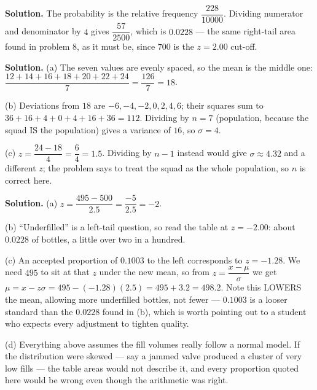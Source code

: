 \documentclass[12pt]{article}
\begin{document}

\textbf{Solution.} The probability is the relative frequency $\dfrac{228}{10000}$. Dividing numerator and denominator by $4$ gives $\dfrac{57}{2500}$, which is $0.0228$ --- the same right-tail area found in problem 8, as it must be, since $700$ is the $z = 2.00$ cut-off.



\textbf{Solution.} (a) The seven values are evenly spaced, so the mean is the middle one: $\dfrac{12+14+16+18+20+22+24}{7} = \dfrac{126}{7} = 18$.
\par
(b) Deviations from $18$ are $-6, -4, -2, 0, 2, 4, 6$; their squares sum to $36+16+4+0+4+16+36 = 112$. Dividing by $n = 7$ (population, because the squad IS the population) gives a variance of $16$, so $\sigma = 4$.
\par
(c) $z = \dfrac{24 - 18}{4} = \dfrac{6}{4} = 1.5$. Dividing by $n-1$ instead would give $\sigma \approx 4.32$ and a different $z$; the problem says to treat the squad as the whole population, so $n$ is correct here.



\textbf{Solution.} (a) $z = \dfrac{495 - 500}{2.5} = \dfrac{-5}{2.5} = -2$.
\par
(b) ``Underfilled'' is a left-tail question, so read the table at $z = -2.00$: about $0.0228$ of bottles, a little over two in a hundred.
\par
(c) An accepted proportion of $0.1003$ to the left corresponds to $z = -1.28$. We need $495$ to sit at that $z$ under the new mean, so from $z = \dfrac{x - \mu}{\sigma}$ we get $\mu = x - z\sigma = 495 - (-1.28)(2.5) = 495 + 3.2 = 498.2$. Note this LOWERS the mean, allowing more underfilled bottles, not fewer --- $0.1003$ is a looser standard than the $0.0228$ found in (b), which is worth pointing out to a student who expects every adjustment to tighten quality.
\par
(d) Everything above assumes the fill volumes really follow a normal model. If the distribution were skewed --- say a jammed valve produced a cluster of very low fills --- the table areas would not describe it, and every proportion quoted here would be wrong even though the arithmetic was right.

\end{document}
